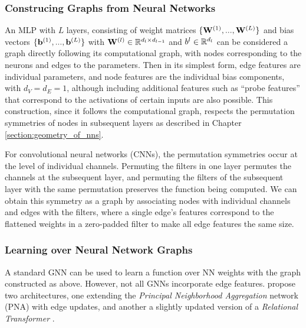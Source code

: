 \subsubsection{Construcing Graphs from Neural Networks}

An MLP with $L$ layers, consisting of weight matrices $\{ \mathbf{W}^{(1)},...,\mathbf{W}^{(L)} \}$ and bias vectors $\{ \mathbf{b}^{(1)},...,\mathbf{b}^{(L)}\}$ with $\mathbf{W}^{(l)} \in \mathbb{R}^{d_l \times d_{l-1}}$ and $b^{l}\in \mathbb{R}^{d_l}$ can be considered a graph directly following its computational graph, with nodes corresponding to the neurons and edges to the parameters. Then in its simplest form, edge features are individual parameters, and node features are the individual bias components, with $d_V = d_E = 1$, although including additional features such as ``probe features'' that correspond to the activations of certain inputs are also possible. This construction, since it follows the computational graph, respects the permutation symmetries of nodes in subsequent layers as described in Chapter \ref{section:geometry_of_nns}.

For convolutional neural networks (CNNs), the permutation symmetries occur at the level of individual channels. Permuting the filters in one layer permutes the channels at the subsequent layer, and permuting the filters of the subsequent layer with the same permutation preserves the function being computed. We can obtain this symmetry as a graph by associating nodes with individual channels and edges with the filters, where a single edge's features correspond to the flattened weights in a zero-padded filter to make all edge features the same size. 

\subsubsection{Learning over Neural Network Graphs}

A standard GNN can be used to learn a function over NN weights with the graph constructed as above. However, not all GNNs incorporate edge features. \citet{kofinasGraphNeuralNetworks2024} propose two architectures, one extending the \textit{Principal Neighborhood Aggregation} network (PNA) \citep{corsoPrincipalNeighbourhoodAggregation2020} with edge updates, and another a slightly updated version of a \textit{Relational Transformer} \citep{diaoRelationalAttentionGeneralizing2023}. 

